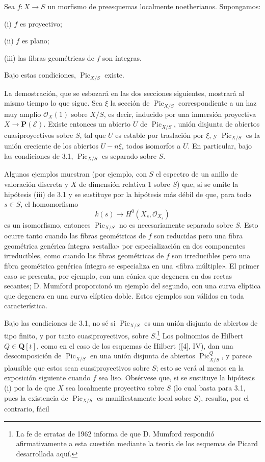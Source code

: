  Sea $f:X\longrightarrow S$ un morfismo de preesquemas
localmente noetherianos. Supongamos:

\noindent (i) $f$ es proyectivo;

\noindent (ii) $f$ es plano;

\noindent (iii) las fibras geométricas de $f$ son íntegras.

Bajo estas condiciones, $\operatorname{Pic}_{X/S}$ existe.

La demostración, que se esbozará en las dos secciones siguientes, mostrará al
mismo tiempo lo que sigue. Sea $\xi$ la sección de
$\operatorname{Pic}_{X/S}$ correspondiente a un haz muy amplio
$\mathcal O_X(1)$ sobre $X/S$, es decir, inducido por una inmersión proyectiva
$X\longrightarrow\mathbf P(\mathcal E)$. Existe entonces un abierto $U$ de
$\operatorname{Pic}_{X/S}$, unión disjunta de abiertos cuasiproyectivos sobre
$S$, tal que $U$ es estable por traslación por $\xi$, y
$\operatorname{Pic}_{X/S}$ es la unión creciente de los abiertos $U-n\xi$,
todos isomorfos a $U$. En particular, bajo las condiciones de 3.1,
$\operatorname{Pic}_{X/S}$ es separado sobre $S$.

 Algunos ejemplos muestran (por ejemplo, con $S$ el
espectro de un anillo de valoración discreta y $X$ de dimensión relativa 1
sobre $S$) que, si se omite la hipótesis (iii) de 3.1 y se sustituye por la
hipótesis más débil de que, para todo $s\in S$, el homomorfismo
\[
k(s)\longrightarrow H^0(X_s,\mathcal O_{X_s})
\]
es un isomorfismo, entonces $\operatorname{Pic}_{X/S}$ no es necesariamente
separado sobre $S$. Esto ocurre tanto cuando las fibras geométricas de $f$ son
reducidas pero una fibra geométrica genérica íntegra «estalla» por
especialización en dos componentes irreducibles, como cuando las fibras
geométricas de $f$ son irreducibles pero una fibra geométrica genérica íntegra
se especializa en una «fibra múltiple». El primer caso se presenta, por ejemplo,
con una cónica que degenera en dos rectas secantes; D. Mumford proporcionó un
ejemplo del segundo, con una curva elíptica que degenera en una curva elíptica
doble. Estos ejemplos son válidos en toda característica.

 Bajo las condiciones de 3.1, no sé si
$\operatorname{Pic}_{X/S}$ es una unión disjunta de abiertos de tipo finito, y
por tanto cuasiproyectivos, sobre $S$.\footnote{La fe de erratas de 1962 informa de
que D. Mumford respondió afirmativamente a esta cuestión mediante la teoría de
los esquemas de Picard desarrollada aquí.} Los polinomios de Hilbert
$Q\in\mathbf Q[t]$, como en el caso de los esquemas de Hilbert ([4], IV), dan
una descomposición de $\operatorname{Pic}_{X/S}$ en una unión disjunta de
abiertos $\operatorname{Pic}^{Q}_{X/S}$, y parece plausible que estos sean
cuasiproyectivos sobre $S$; esto se verá al menos en la exposición siguiente
cuando $f$ sea liso. Obsérvese que, si se sustituye la hipótesis (i) por la de
que $X$ sea localmente proyectivo sobre $S$ (lo cual basta para 3.1, pues la
existencia de $\operatorname{Pic}_{X/S}$ es manifiestamente local sobre $S$),
resulta, por el contrario, fácil

